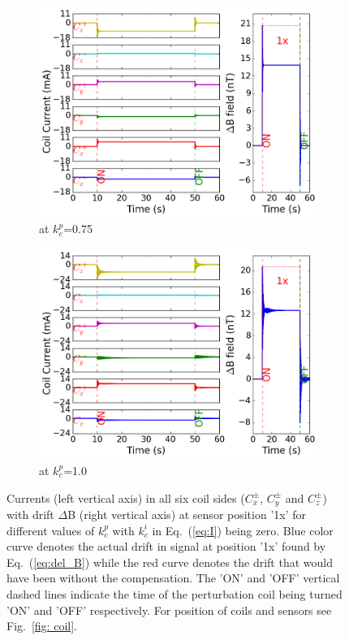 \begin{figure}[!htb]
    \begin{subfigure}{.5\linewidth}
        \centering
        \includegraphics[width=\linewidth, height= 6.5 cm]{Images/p75_33}
        \caption{at $k_c^p$=0.75}
        \label{fig:p75}
    \end{subfigure}%
        \begin{subfigure}{.5\linewidth}
        \centering
        \includegraphics[width=\linewidth, height= 6.5 cm]{Images/p100_33}
        \caption{at $k_c^p$=1.0}
        \label{fig:p100}
    \end{subfigure}

    \caption{Currents (left vertical axis) in all six coil sides ($C_x^\pm$, $C_y^\pm$ and $C_z^\pm$) with drift $\Delta$B (right vertical axis) at sensor position '1x' for different values of $k_c^p$ with $k_c^i$ in Eq.~(\ref{eq:I}) being zero. Blue color curve denotes the actual drift in signal at position '1x' found by Eq.~(\ref{eq:del_B}) while the red curve denotes the drift that would have been without the compensation. The 'ON' and 'OFF' vertical dashed lines indicate the time of the perturbation coil being turned 'ON' and 'OFF' respectively. For position of coils and sensors see Fig.~\ref{fig: coil}. }
    \label{fig:p_pi}
\end{figure}

